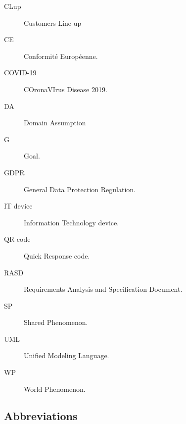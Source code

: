 \documentclass[../../main.tex]{subfiles}
\begin{document}
\begin{description}
    
    \item[CLup] Customers Line-up

    \item[CE] Conformité Européenne.
    
    \item[COVID-19] COronaVIrus Disease 2019.
    
    \item[DA] Domain Assumption
    
    \item[G] Goal.

    \item[GDPR] General Data Protection Regulation.
    
    \item[IT device] Information Technology device.
    
    \item[QR code] Quick Response code.
    
    \item[RASD] Requirements Analysis and Specification Document.
    
    \item[SP] Shared Phenomenon.
    
    \item[UML] Unified Modeling Language.
    
    \item[WP] World Phenomenon.
\end{description}

\subsection{Abbreviations}
\end{document}
